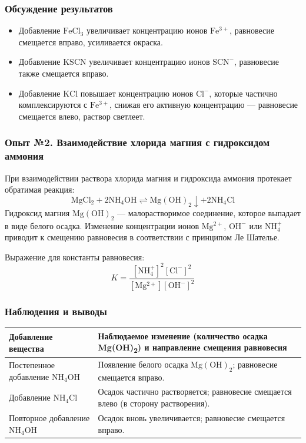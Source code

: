 \documentclass[a4paper,12pt]{article}
\begin{document}
	\subsubsection*{Обсуждение результатов}
	
	\begin{itemize}
		\item Добавление \(\mathrm{FeCl_3}\) увеличивает концентрацию ионов \(\mathrm{Fe^{3+}}\), равновесие смещается вправо, усиливается окраска.
		\item Добавление \(\mathrm{KSCN}\) увеличивает концентрацию ионов \(\mathrm{SCN^-}\), равновесие также смещается вправо.
		\item Добавление \(\mathrm{KCl}\) повышает концентрацию ионов \(\mathrm{Cl^-}\), которые частично комплексируются с \(\mathrm{Fe^{3+}}\), снижая его активную концентрацию — равновесие смещается влево, раствор светлеет.
	\end{itemize}
	
	\subsubsection*{Опыт №2. Взаимодействие хлорида магния с гидроксидом аммония}
	
	При взаимодействии раствора хлорида магния и гидроксида аммония протекает обратимая реакция:
	\[
	\mathrm{MgCl_2 + 2NH_4OH \rightleftharpoons Mg(OH)_2 \downarrow + 2NH_4Cl}
	\]
	Гидроксид магния \(\mathrm{Mg(OH)_2}\) — малорастворимое соединение, которое выпадает в виде белого осадка.  
	Изменение концентрации ионов \(\mathrm{Mg^{2+}}\), \(\mathrm{OH^-}\) или \(\mathrm{NH_4^+}\) приводит к смещению равновесия в соответствии с принципом Ле Шателье.
	
	Выражение для константы равновесия:
	\[
	K = \frac{[\mathrm{NH_4^+}]^2 [\mathrm{Cl^-}]^2}{[\mathrm{Mg^{2+}}][\mathrm{OH^-}]^2}
	\]
	
	\subsubsection*{Наблюдения и выводы}
	
	\begin{center}
		\renewcommand{\arraystretch}{1.3}
		\setlength{\extrarowheight}{2pt}
		\begin{tabularx}{\textwidth}{|>{\raggedright\arraybackslash}X|
				>{\centering\arraybackslash}m{5cm}|}
			\hline
			\textbf{Добавление вещества} &
			\textbf{Наблюдаемое изменение (количество осадка Mg(OH)\textsubscript{2}) и направление смещения равновесия} \\ \hline
			Постепенное добавление \(\mathrm{NH_4OH}\) &
			Появление белого осадка \(\mathrm{Mg(OH)_2}\); равновесие смещается вправо. \\ \hline
			Добавление \(\mathrm{NH_4Cl}\) &
			Осадок частично растворяется; равновесие смещается влево (в сторону растворения). \\ \hline
			Повторное добавление \(\mathrm{NH_4OH}\) &
			Осадок вновь увеличивается; равновесие смещается вправо. \\ \hline
		\end{tabularx}
	\end{center}
	
\end{document}
